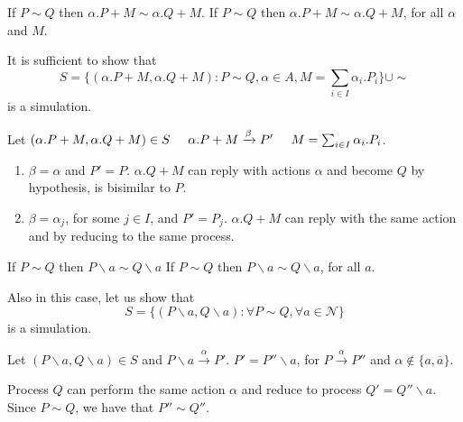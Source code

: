 \begin{Lemma}{If $P\sim Q$ then $\alpha.P+M\sim \alpha.Q+M$.}{}
If $P\sim Q$ then $\alpha.P+M\sim \alpha.Q+M$, for all $\alpha$ and $M$.

\begin{demonstration}
    It is sufficient to show that
    \begin{equation*}
        S=\{(\alpha.P+M, \alpha.Q+M): P\sim Q, \alpha \in A, M=\sum_{i\in I}\alpha_i.P_i\}\cup \sim
    \end{equation*}
    is a simulation.

    Let $(\alpha.P+M, \alpha.Q+M)\in S\hspace{.5cm}\alpha.P+M\xrightarrow{\beta}P'\hspace{.5cm}M=\sum_{i \in I}\alpha_i.P_i$.
    \begin{enumerate}
        \item $\beta = \alpha$ and $P' = P$. $\alpha.Q+M$ can reply with actions $\alpha$ and become $Q$ by hypothesis, is bisimilar to $P$.
        \item $\beta = \alpha_j$, for some $j\in I$, and $P' = P_j$. $\alpha.Q + M$ can reply with the same action and by reducing to the same process.
    \end{enumerate}
\end{demonstration}
\end{Lemma}

\begin{Lemma}{If $P\sim Q$ then $P\backslash a\sim Q\backslash a$}{}
    If $P\sim Q$ then $P\backslash a\sim Q\backslash a$, for all $a$.
\begin{demonstration}
    Also in this case, let us show that
    \begin{equation*}
        S = \{(P\backslash a, Q\backslash a):\forall P\sim Q, \forall a\in \mathcal{N}\}
    \end{equation*}
    is a simulation.
    
    Let $(P\backslash a, Q\backslash a)\in S$ and $P\backslash a\xrightarrow{\alpha}P'$. $P' = P''\backslash a$, for $P\xrightarrow{\alpha}P''$ and $\alpha\notin\{a, \overline{a}\}$.

    Process $Q$ can perform the same action $\alpha$ and reduce to process $Q'=Q''\backslash a$. Since $P\sim Q$, we have that $P''\sim Q''$.
\end{demonstration}
\end{Lemma}


